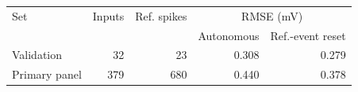 \begin{tabularx}{\textwidth}{Xrrrr}
\toprule
Set & Inputs & Ref. spikes & \multicolumn{2}{c}{RMSE (mV)}\\
 & & & Autonomous & Ref.-event reset\\
\midrule
Validation & 32 & 23 & 0.308 & 0.279\\
Primary panel & 379 & 680 & 0.440 & 0.378\\
\bottomrule
\end{tabularx}
